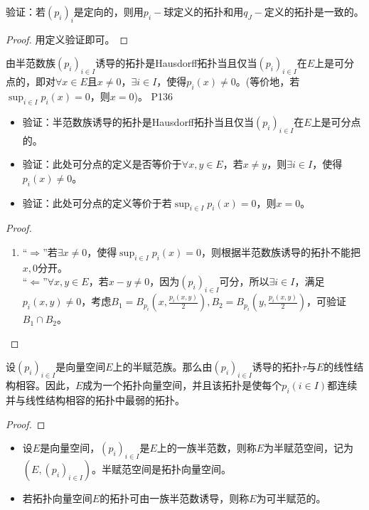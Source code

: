 \begin{proposition}
		验证：$若(p_{i})_{i}$是定向的，则用$p_{i}- $球定义的拓扑和用$q_{J}- $定义的拓扑是一致的。 
\end{proposition}

\begin{proof}
	用定义验证即可。
\end{proof}

\original
{
	由半范数族$(p_{i})_{i\in I} $诱导的拓扑是Hausdorff拓扑当且仅当$(p_{i})_{i\in I} $在$E $上是可分点的，即对$\forall x\in E $且$x\neq 0 $，$\exists i \in I $，使得$p_{i}(x)\neq 0 $。(等价地，若$\sup_{i\in I} p_{i}(x)=0$，则$x=0$)。
}
{P136}
\begin{proposition}
	\begin{itemize}
		\item 验证：半范数族诱导的拓扑是Hausdorff拓扑当且仅当$(p_{i})_{i\in I} $在$E$上是可分点的。
		\item 验证：此处可分点的定义是否等价于$\forall x,y\in E$，若$x\neq y $，则$\exists i\in I $，使得$p_{i}(x)\neq 0 $。
		\item 验证：此处可分点的定义等价于若$\sup_{i \in I} p_{i}(x) =0 $，则$x=0 $。
	\end{itemize}
\end{proposition}

\begin{proof}
	\begin{enumerate}
		\item “$\Rightarrow$”若$\exists x\neq  0$，使得$\sup_{i \in I}p_{i}(x)=0 $，则根据半范数族诱导的拓扑不能把$x,0$分开。\\
		“$\Leftarrow $”$\forall x,y\in E $，若$ x-y \neq 0$，因为$(p_{i})_{i\in I} $可分，所以$\exists i\in I $，满足$p_{i}(x,y)\neq 0 $，考虑$B_{1}=B_{p_{i}}(x,\frac{p_{i}(x,y)}{2}) ,B_{2}=B_{p_{i}}(y,\frac{p_{i}(x,y)}{2})$，可验证$B_{1}\cap B_{2} $。
	\end{enumerate}
\end{proof}

\begin{theorem}
	设$(p_{i})_{i\in I} $是向量空间$E$上的半赋范族。那么由$(p_{i})_{i\in I} $诱导的拓扑$\tau $与$E$的线性结构相容。因此，$E$成为一个拓扑向量空间，并且该拓扑是使每个$p_{i}(i\in I)$都连续并与线性结构相容的拓扑中最弱的拓扑。
\end{theorem}
\begin{proof}
	
\end{proof}

\begin{definition}
	\begin{itemize}
		\item 设$E$是向量空间，$(p_{i})_{i\in I} $是$E$上的一族半范数，则称$E$为半赋范空间，记为$(E,(p_{i})_{i\in I}) $。半赋范空间是拓扑向量空间。
		\item 若拓扑向量空间$E$的拓扑可由一族半范数诱导，则称$E$为可半赋范的。
	\end{itemize}
\end{definition}

